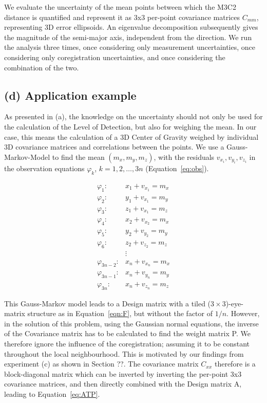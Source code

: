 \documentclass[preprint,12pt,3p]{elsarticle}
\begin{document}
We evaluate the uncertainty of the mean points between which the M3C2 distance is quantified and represent it as 3x3 per-point covariance matrices $C_{mm}$, representing 3D error ellipsoids. An eigenvalue decomposition subsequently gives the magnitude of the semi-major axis, independent from the direction. We run the analysis three times, once  considering only measurement uncertainties, once considering only coregistration uncertainties, and once considering the combination of the two.

\subsection{(d) Application example}

As presented in (a), the knowledge on the uncertainty should not only be used for the calculation of the Level of Detection, but also for weighing the mean. In our case, this means the calculation of a 3D Center of Gravity weighed by individual 3D covariance matrices and correlations between the points. We use a Gauss-Markov-Model to find the mean $(m_x, m_y, m_z)$, with the residuals $v_{x_i}, v_{y_i}, v_{z_i}$ in the observation equations $\varphi_k$, $k=1,2,\dots,3n$ (Equation~\ref{eq:obs}).

\begin{equation}
\begin{array}{rl}
\varphi_1:& x_1 + v_{x_1} = m_x\\
\varphi_2:& y_1 + v_{x_1} = m_y\\
\varphi_3:& z_1 + v_{x_1} = m_z\\
\varphi_4:& x_2 + v_{x_2} = m_x\\
\varphi_5:& y_2 + v_{y_2} = m_y\\
\varphi_6:& z_2 + v_{z_2} = m_z\\
&\vdots \\
\varphi_{3n-2}:& x_n + v_{x_n} = m_x\\
\varphi_{3n-1}:& x_n + v_{y_n} = m_y\\
\varphi_{3n}:& x_n + v_{z_n} = m_z
\end{array}
\label{eq:obs}
\end{equation}

This Gauss-Markov model leads to a Design matrix with a tiled ($3\times3$)-eye-matrix structure as in Equation~\ref{eqn:F}, but without the factor of $1/n$. However, in the solution of this problem, using the Gaussian normal equations, the inverse of the Covariance matrix has to be calculated to find the weight matrix P. We therefore ignore the influence of the coregistration; assuming it to be constant throughout the local neighbourhood. This is motivated by our findings from experiment (c) as shown in Section ??. The covariance matrix $C_{xx}$ therefore is a block-diagonal matrix which can be inverted by inverting the per-point 3x3 covariance matrices, and then directly combined with the Design matrix A, leading to Equation~\ref{eq:ATP}.
\end{document}
